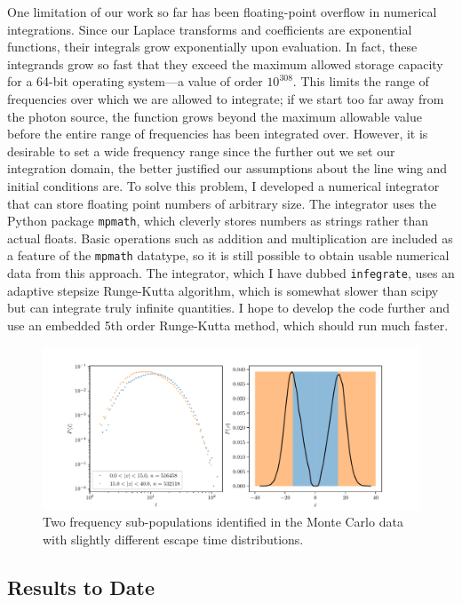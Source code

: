 \documentclass[onecolumn]{aastex63}
\begin{document}
One limitation of our work so far has been floating-point overflow in numerical integrations. Since our Laplace transforms and coefficients are exponential functions, their integrals grow exponentially upon evaluation. In fact, these integrands grow so fast that they exceed the maximum allowed storage capacity for a 64-bit operating system---a value of order $10^{308}$. This limits the range of frequencies over which we are allowed to integrate; if we start too far away from the photon source, the function grows beyond the maximum allowable value before the entire range of frequencies has been integrated over. However, it is desirable to set a wide frequency range since the further out we set our integration domain, the better justified our assumptions about the line wing and initial conditions are. To solve this problem, I developed a numerical integrator that can store floating point numbers of arbitrary size. The integrator uses the Python package \texttt{mpmath}, which cleverly stores numbers as strings rather than actual floats. Basic operations such as addition and multiplication are included as a feature of the \texttt{mpmath} datatype, so it is still possible to obtain usable numerical data from this approach. The integrator, which I have dubbed \texttt{infegrate}, uses an adaptive stepsize Runge-Kutta algorithm, which is somewhat slower than scipy but can integrate truly infinite quantities. I hope to develop the code further and use an embedded 5th order Runge-Kutta method, which should run much faster.

\begin{figure}
    \centering
    \includegraphics[width=\textwidth]{t-escape_frequency-study.pdf}
    \caption{Two frequency sub-populations identified in the Monte Carlo data with slightly different escape time distributions.}
    \label{mc_freqs}
\end{figure}

\newpage
\subsection{Results to Date}
\end{document}
